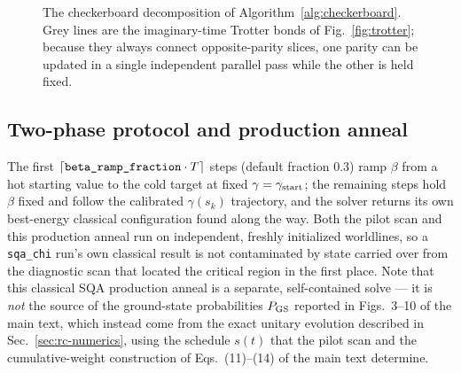 \documentclass[11pt]{article}
\begin{document}
\begin{figure}[h]
\centering
{}
\caption{The checkerboard decomposition of Algorithm~\ref{alg:checkerboard}. Grey lines are the
imaginary-time Trotter bonds of Fig.~\ref{fig:trotter}; because they always connect
opposite-parity slices, one parity can be updated in a single independent parallel pass while the
other is held fixed.}
\label{fig:checkerboard}
\end{figure}

\subsection{Two-phase protocol and production anneal}
The first $\lceil\text{\texttt{beta\_ramp\_fraction}}\cdot T\rceil$
steps (default fraction $0.3$) ramp $\beta$ from a hot starting value to the cold target at fixed
$\gamma=\gamma_{\rm start}$; the remaining steps hold $\beta$ fixed and follow the calibrated
$\gamma(s_k)$ trajectory, and the solver returns its own best-energy classical configuration found
along the way. Both the pilot scan and this production anneal run on independent, freshly
initialized worldlines, so a \texttt{sqa\_chi} run's own classical result is not contaminated by
state carried over from the diagnostic scan that located the critical region in the first place.
Note that this classical SQA production anneal is a separate, self-contained solve --- it is
\emph{not} the source of the ground-state probabilities $P_{\rm GS}$ reported in Figs.~3--10 of
the main text, which instead come from the exact unitary evolution described in
Sec.~\ref{sec:rc-numerics}, using the schedule $s(t)$ that the pilot scan and the cumulative-weight
construction of Eqs.~(11)--(14) of the main text determine.
\end{document}
